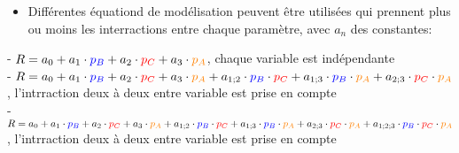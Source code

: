 \documentclass[10pt]{article}
\begin{document}
{\begin{minipage}{1.05\textwidth}

\end{minipage}}

\begin{itemize}

        \item Différentes équationd de modélisation peuvent être utilisées qui prennent plus ou moins les interractions entre chaque paramètre, avec $a_{n}$ des constantes:

\end{itemize}

\vspace{2cm}

- $R = a_{0} + a_{1}\cdot \color{blue}p_{B}\color{black} + a_{2}\cdot \color{red}p_{C}\color{black} + a_{3}\cdot \color{orange}p_{A}\color{black}$, chaque variable est indépendante \\

- $R = a_{0} + a_{1}\cdot \color{blue}p_{B}\color{black} + a_{2}\cdot \color{red}p_{C}\color{black} + a_{3}\cdot \color{orange}p_{A}\color{black} + a_{1;2}\cdot \color{blue}p_{B}\color{black}\cdot \color{red}p_{C}\color{black} + a_{1;3}\cdot \color{blue}p_{B}\color{black}\cdot \color{orange}p_{A}\color{black} + a_{2;3}\cdot \color{red}p_{C}\color{black}\cdot \color{orange}p_{A}\color{black}$, l'intrraction deux à deux entre variable est prise en compte \\

- $R = a_{0} + a_{1}\cdot \color{blue}p_{B}\color{black} + a_{2}\cdot \color{red}p_{C}\color{black} + a_{3}\cdot \color{orange}p_{A}\color{black} + a_{1;2}\cdot \color{blue}p_{B}\color{black}\cdot \color{red}p_{C}\color{black} + a_{1;3}\cdot \color{blue}p_{B}\color{black}\cdot \color{orange}p_{A}\color{black} + a_{2;3}\cdot \color{red}p_{C}\color{black}\cdot \color{orange}p_{A}\color{black} + a_{1;2;3}\cdot \color{blue}p_{B}\color{black}\cdot \color{red}p_{C}\color{black}\cdot \color{orange}p_{A}\color{black}$, l'intrraction deux à deux entre variable est prise en compte \\
\end{document}
